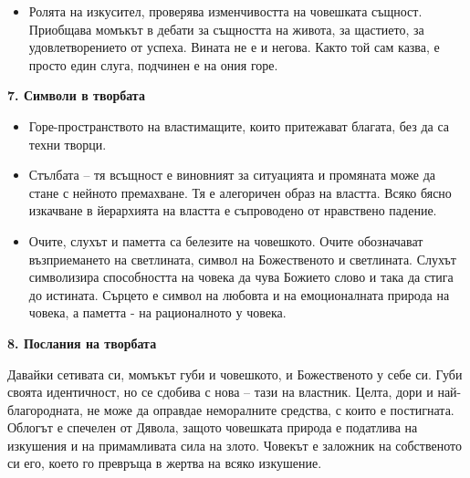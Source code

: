 \documentclass[12pt,a4paper]{article}
\begin{document}
\begin{itemize}
\vspace{-0.65cm}
\item Ролята на изкусител, проверява изменчивостта на човешката същност.  Приобщава момъкът в дебати за същността на живота, за щастието, за удовлетворението от успеха.
Вината не е и негова. Както той сам казва, е просто един слуга, подчинен е на ония горе. 
\end{itemize}

\vspace{0.1cm}

\textbf{7. Символи в творбата}
\vspace{0.1cm}
\begin{itemize}
\vspace{-0.25cm}
\item Горе-пространството на властимащите, които притежават благата, без да са техни творци.
\end{itemize} 

\begin{itemize}
\vspace{-0.65cm}
\item Стълбата – тя всъщност е виновният за ситуацията и промяната може да стане с нейното премахване. Тя е алегоричен образ на властта. Всяко бясно изкачване в йерархията на властта е съпроводено от нравствено падение.
\end{itemize}

\begin{itemize}
\vspace{-0.65cm}
\item Очите, слухът и паметта са белезите на човешкото.
Очите обозначават възприемането на светлината, символ на Божественото и светлината.
Слухът символизира способността на човека да чува Божието слово и така да стига до истината.
Сърцето е символ на любовта и на емоционалната природа на човека, а паметта - на рационалното у човека.
\end{itemize}

\vspace{0.1cm}

\textbf{8. Послания на творбата}
\vspace{0.1cm}

\indent Давайки сетивата си, момъкът губи и човешкото, и Божественото у себе си. Губи своята идентичност, но се сдобива с нова – тази на властник. Целта, дори и най-благородната, не може да оправдае неморалните средства, с които е постигната.
Облогът е спечелен от Дявола, защото човешката природа е податлива на изкушения и на примамливата сила на злото. Човекът е заложник на собственото си его, което го превръща в жертва на всяко изкушение.
\vspace{0.1cm}
\end{document}
